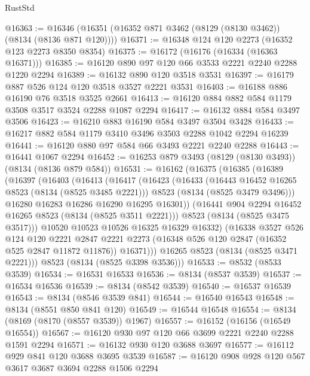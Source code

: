 \begin{lexlean}{RustStd}
\begin{coremodule}
@16363 := @16346 (@16351 (@16352 @871 @3462 (@8129 (@8130 @3462)) (@8134 (@8136 @871 @120))))
@16371 := @16348 @124 @120 @2273 (@16352 @123 @2273 @8350 @8354)
@16375 := @16172 (@16176 (@16334 (@16363 @16371)))
@16385 := @16120 @890 @97 @120 @66 @3533 @2221 @2240 @2288 @1220 @2294
@16389 := @16132 @890 @120 @3518 @3531
@16397 := @16179 @887 @526 @124 @120 @3518 @3527 @2221 @3531
@16403 := @16188 @886 @16190 @76 @3518 @3525 @2661
@16413 := @16120 @884 @882 @584 @1179 @3508 @3517 @3524 @2288 @1087 @2294
@16417 := @16132 @884 @584 @3497 @3506
@16423 := @16210 @883 @16190 @584 @3497 @3504 @3428
@16433 := @16217 @882 @584 @1179 @3410 @3496 @3503 @2288 @1042 @2294 @16239
@16441 := @16120 @880 @97 @584 @66 @3493 @2221 @2240 @2288
@16443 := @16441 @1067 @2294
@16452 := @16253 @879 @3493 (@8129 (@8130 @3493)) (@8134 (@8136 @879 @584))
@16531 := @16162
    (@16375
      (@16385
        (@16389
          (@16397
            (@16403
              (@16413
                (@16417
                  (@16423
                    (@16433
                      (@16443 @16452 @16265 @8523 (@8134 (@8525 @3485 @2221)))
                      @8523
                      (@8134 (@8525 @3479 @3496)))
                    @16280
                    @16283
                    @16286
                    @16290
                    @16295
                    @16301))
                (@16441 @904 @2294 @16452 @16265 @8523 (@8134 (@8525 @3511 @2221)))
                @8523
                (@8134 (@8525 @3475 @3517)))
              @10520
              @10523
              @10526
              @16325
              @16329
              @16332)
            (@16338
              @3527
              @526
              @124
              @120
              @2221
              @2847
              @2221
              @2273
              (@16348 @526 @120 @2847 (@16352 @525 @2847 @11872 @11876))
              @16371)))
        @16265
        @8523
        (@8134 (@8525 @3471 @2221)))
      @8523
      (@8134 (@8525 @3398 @3536)))
@16533 := @8532 (@8533 @3539)
@16534 := @16531 @16533
@16536 := @8134 (@8537 @3539)
@16537 := @16534 @16536
@16539 := @8134 (@8542 @3539)
@16540 := @16537 @16539
@16543 := @8134 (@8546 @3539 @841)
@16544 := @16540 @16543
@16548 := @8134 (@8551 @850 @841 @120)
@16549 := @16544 @16548
@16554 := @8134 (@8169 (@8170 (@8557 @3539)) @1967)
@16557 := @16152 (@16156 (@16549 @16554))
@16567 := @16120 @930 @97 @120 @66 @3699 @2221 @2240 @2288 @1591 @2294
@16571 := @16132 @930 @120 @3688 @3697
@16577 := @16112 @929 @841 @120 @3688 @3695 @3539
@16587 := @16120 @908 @928 @120 @567 @3617 @3687 @3694 @2288 @1506 @2294

\end{coremodule}
\end{lexlean}
